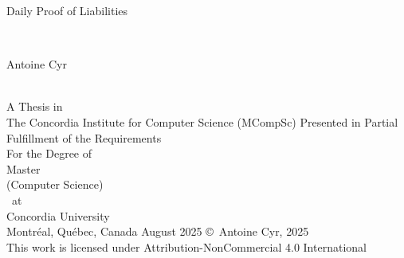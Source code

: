 
\thispagestyle{empty} %

\begin{center} 
\begin{Large} Daily Proof of Liabilities \end{Large}\\[3em]
\begin{large} Antoine Cyr \end{large}\\
\vfill
A Thesis in\\
The Concordia Institute for Computer Science (MCompSc)
\vfill
Presented in Partial Fulfillment of the Requirements\\
For the Degree of\\
Master\\ 
(Computer Science)\\~at\\
Concordia University\\
Montr\'{e}al, Qu\'{e}bec, Canada
\vfill
August 2025
\vfill
\copyright~Antoine Cyr, 2025\\
This work is licensed under Attribution-NonCommercial 4.0 International
\end{center}

